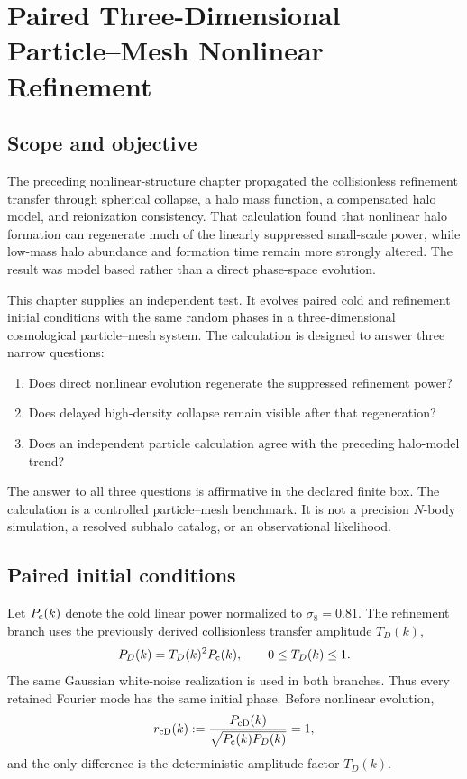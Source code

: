 \chapter{Paired Three-Dimensional Particle--Mesh Nonlinear Refinement}
\label{ch:paired-pm-nonlinear}

\section{Scope and objective}

The preceding nonlinear-structure chapter propagated the collisionless refinement transfer through spherical collapse, a halo mass function, a compensated halo model, and reionization consistency.  That calculation found that nonlinear halo formation can regenerate much of the linearly suppressed small-scale power, while low-mass halo abundance and formation time remain more strongly altered.  The result was model based rather than a direct phase-space evolution.

This chapter supplies an independent test.  It evolves paired cold and refinement initial conditions with the same random phases in a three-dimensional cosmological particle--mesh system.  The calculation is designed to answer three narrow questions:
\begin{enumerate}[leftmargin=2em]
\item Does direct nonlinear evolution regenerate the suppressed refinement power?
\item Does delayed high-density collapse remain visible after that regeneration?
\item Does an independent particle calculation agree with the preceding halo-model trend?
\end{enumerate}

The answer to all three questions is affirmative in the declared finite box.  The calculation is a controlled particle--mesh benchmark.  It is not a precision $N$-body simulation, a resolved subhalo catalog, or an observational likelihood.

\section{Paired initial conditions}

Let $P_{\rm c}(k)$ denote the cold linear power normalized to $\sigma_8=0.81$.  The refinement branch uses the previously derived collisionless transfer amplitude $T_D(k)$,
\begin{equation}
 P_D(k)=T_D(k)^2P_{\rm c}(k),
 \qquad 0\leq T_D(k)\leq1.
 \label{eq:pm-paired-linear-power}
\end{equation}
The same Gaussian white-noise realization is used in both branches.  Thus every retained Fourier mode has the same initial phase.  Before nonlinear evolution,
\begin{equation}
 r_{\rm cD}(k)
 :=
 \frac{P_{\rm cD}(k)}{\sqrt{P_{\rm c}(k)P_D(k)}}=1,
 \label{eq:pm-initial-cross-correlation}
\end{equation}
and the only difference is the deterministic amplitude factor $T_D(k)$.

